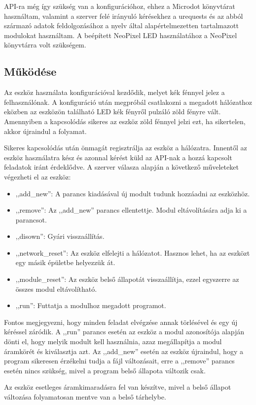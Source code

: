 \documentclass{thesis-ekf}
\theoremstyle{definition}
\theoremstyle{remark}
\begin{document}
	 API-ra még így szükség van a konfigurációhoz, ehhez a Microdot könyvtárat használtam, valamint a szerver felé irányuló kérésekhez a urequests és az abból származó adatok feldolgozásához a nyelv által alapértelmezetten tartalmazott modulokat használtam. A beépített NeoPixel LED használatához a NeoPixel könyvtárra volt szükségem.
	 \subsection{Működése}
	 Az eszköz használata konfigurációval kezdődik, melyet kék fénnyel jelez a felhasználónak. A konfiguráció után megpróbál csatlakozni a megadott hálózathoz eközben az eszközön található LED kék fényről pulzáló zöld fényre vált. Amennyiben a kapcsolódás sikeres az eszköz zöld fénnyel jelzi ezt, ha sikertelen, akkor újraindul a folyamat.
	 
	 Sikeres kapcsolódás után önmagát regisztrálja az eszköz a hálózatra. Innentől az eszköz használatra kész és azonnal kérést küld az API-nak a hozzá kapcsolt feladatok iránt érdeklődve. A szerver válasza alapján a következő műveleteket végezheti el az eszköz:
	 \begin{itemize}
	 	\item ,,add\_new'': A parancs kiadásával új modult tudunk hozzáadni az eszközhöz.
	 	\item ,,remove'': Az ,,add\_new'' parancs ellentettje. Modul eltávolítására adja ki a parancsot.
	 	\item ,,disown'': Gyári visszaállítás.
	 	\item ,,network\_reset'': Az eszköz elfelejti a hálózatot. Hasznos lehet, ha az eszközt egy másik épületbe helyezzük át.
	 	\item ,,module\_reset'': Az eszköz belső állapotát visszaállítja, ezzel egyszerre az összes modul eltávolítható.
	 	\item ,,run'': Futtatja a modulhoz megadott programot.
	 \end{itemize}
	 Fontos megjegyezni, hogy minden feladat elvégzése annak törlésével és egy új kéréssel záródik. A ,,run'' parancs esetén az eszköz a modul azonosítója alapján dönti el, hogy melyik modult kell használnia, azaz megállapítja a modul áramkörét és kiválasztja azt. Az ,,add\_new'' esetén az eszköz újraindul, hogy a program sikeresen érzékelni tudja a fájl változásait, erre a ,,remove'' parancs esetén nincs szükség, mivel a program belső állapota változik csak.
	 
	  Az eszköz esetleges áramkimaradásra fel van készítve, mivel a belső állapot változása folyamatosan mentve van a belső tárhelybe.
\end{document}
